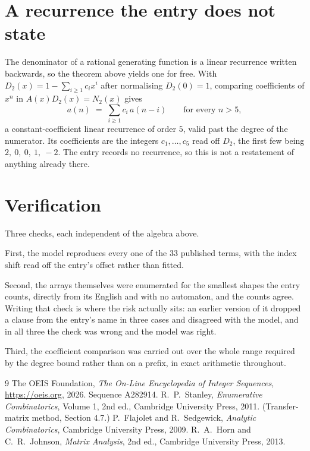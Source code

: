 \documentclass[11pt,a4paper]{article}
\theoremstyle{plain}
\theoremstyle{definition}
\begin{document}
\section{A recurrence the entry does not state}

The denominator of a rational generating function is a linear recurrence written backwards, so
the theorem above yields one for free. With $D_2(x)=1-\sum_{i\ge1}c_ix^i$ after normalising
$D_2(0)=1$, comparing coefficients of $x^n$ in $A(x)D_2(x)=N_2(x)$ gives
\[
a(n)\;=\;\sum_{i\ge1}c_i\,a(n-i)\qquad\text{for every }n>5,
\]
a constant-coefficient linear recurrence of order $5$, valid past the degree of the
numerator. Its coefficients are the integers $c_1,\dots,c_{5}$ read off $D_2$, the first few being $2,\ 0,\ 0,\ 1,\ -2$. The entry records no recurrence, so this is not a restatement of anything
already there.

\section{Verification}

Three checks, each independent of the algebra above.

First, the model reproduces every one of the $33$ published terms, with the index shift
read off the entry's offset rather than fitted.

Second, the arrays themselves were enumerated for the smallest shapes the entry counts,
directly from its English and with no automaton, and the counts agree. Writing that check is
where the risk actually sits: an earlier version of it dropped a clause from the entry's name
in three cases and disagreed with the model, and in all three the check was wrong and the model
was right.

Third, the coefficient comparison was carried out over the whole range required by the degree
bound rather than on a prefix, in exact arithmetic throughout.

\begin{thebibliography}{9}
 The OEIS Foundation, \emph{The On-Line Encyclopedia of Integer
Sequences}, \url{https://oeis.org}, 2026. Sequence A282914.
 R.~P.~Stanley, \emph{Enumerative Combinatorics}, Volume 1, 2nd ed.,
Cambridge University Press, 2011. (Transfer-matrix method, Section 4.7.)
 P.~Flajolet and R.~Sedgewick, \emph{Analytic Combinatorics}, Cambridge
University Press, 2009.
 R.~A.~Horn and C.~R.~Johnson, \emph{Matrix Analysis}, 2nd ed., Cambridge
University Press, 2013.
\end{thebibliography}
\end{document}
